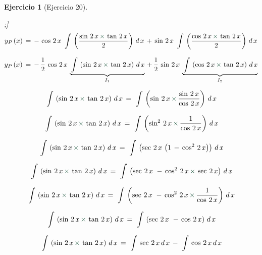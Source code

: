 \documentclass[a4paper,11pt, openany]{book}
\newtheorem{ejer}{Ejercicio}[section]
\newcommand*{\itembolasazules}[1]{%
\footnotesize\protect\tikz[baseline=-3pt]%
\protect\node[scale=.7, circle, shade, ball
color=green]{\color{white}\Large\bf#1};}
\begin{document}
\begin{ejer}[Ejercicio 20]
\begin{enumerate}[label=\itembolasazules{\arabic*}]
$$y_{P}\,(x)\,=\,-\,\cos\,2\,x\,\displaystyle\,\int\,\left(\dfrac{\sin\,2\,x\,\textcolor{britishracinggreen}{\times}\,\tan\,2\,x }{2}  \right)\,d\,x\,+\,\sin\,2\,x\,\displaystyle\,\int\,\left(\dfrac{\cos\,2\,x\,\textcolor{britishracinggreen}{\times}\,\tan\,2\,x }{2 }  \right)\,d\,x$$
 
$$y_{P}\,(x)\,=\,-\,\dfrac{1}{2}\,\cos\,2\,x\,\underbrace{\displaystyle\,\int\,\left(\sin\,2\,x\,\textcolor{britishracinggreen}{\times}\,\tan\,2\,x  \right)\,d\,x}_{I_{1}}\,+\,\dfrac{1}{2}\,\sin\,2\,x\,\underbrace{\displaystyle\,\int\,\left(\cos\,2\,x\,\textcolor{britishracinggreen}{\times}\,\tan\,2\,x  \right)\,d\,x}_{I_{2}}$$
 
\newpage
 
\begin{tcolorbox}[colback=brown!5!white,colframe=brown!75!black,fonttitle=\bfseries,title=$I_{1}$]
 
$$\displaystyle\,\int\,\left(\sin\,2\,x\,\textcolor{britishracinggreen}{\times}\,\tan\,2\,x  \right)\,d\,x\,=\,\displaystyle\,\int\,\left(\sin\,2\,x\,\textcolor{britishracinggreen}{\times}\,\dfrac{\sin\,2\,x}{\cos\,2\,x}  \right)\,d\,x$$
 
$$\displaystyle\,\int\,\left(\sin\,2\,x\,\textcolor{britishracinggreen}{\times}\,\tan\,2\,x  \right)\,d\,x\,=\,\displaystyle\,\int\,\left(\sin^{2}\,2\,x\,\textcolor{britishracinggreen}{\times}\,\dfrac{1}{\cos\,2\,x}  \right)\,d\,x$$
 
$$\displaystyle\,\int\,\left(\sin\,2\,x\,\textcolor{britishracinggreen}{\times}\,\tan\,2\,x  \right)\,d\,x\,=\,\displaystyle\,\int\,\left(\sec\,2\,x\,\left(1\,-\,\cos^{2}\,2\,x \right) \right)\,d\,x$$
 
$$\displaystyle\,\int\,\left(\sin\,2\,x\,\textcolor{britishracinggreen}{\times}\,\tan\,2\,x  \right)\,d\,x\,=\,\displaystyle\,\int\,\left(\sec\,2\,x\,\,-\,\cos^{2}\,2\,x\,\textcolor{britishracinggreen}{\times}\,\sec\,2\,x  \right)\,d\,x$$
 
$$\displaystyle\,\int\,\left(\sin\,2\,x\,\textcolor{britishracinggreen}{\times}\,\tan\,2\,x  \right)\,d\,x\,=\,\displaystyle\,\int\,\left(\sec\,2\,x\,\,-\,\cos^{2}\,2\,x\,\textcolor{britishracinggreen}{\times}\,\dfrac{1}{\cos\,2\,x} \right)\,d\,x$$
 
$$\displaystyle\,\int\,\left(\sin\,2\,x\,\textcolor{britishracinggreen}{\times}\,\tan\,2\,x  \right)\,d\,x\,=\,\displaystyle\,\int\,\left(\sec\,2\,x\,\,-\,\cos\,2\,x \right)\,d\,x$$
 
$$\displaystyle\,\int\,\left(\sin\,2\,x\,\textcolor{britishracinggreen}{\times}\,\tan\,2\,x  \right)\,d\,x\,=\,\displaystyle\,\int\,\sec\,2\,x\,d\,x\,-\,\displaystyle\,\int\,\cos\,2\,x\,d\,x$$
 

\end{tcolorbox}
\end{enumerate}
\end{ejer}
\end{document}
